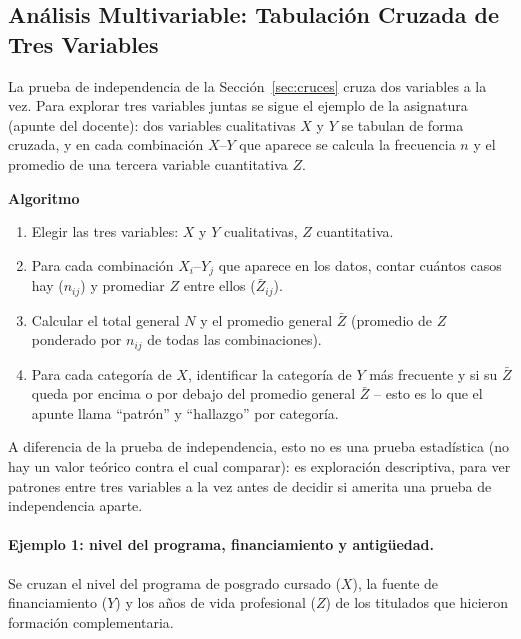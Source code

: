\documentclass[12pt, a4paper]{article}
\begin{document}


\subsection{Análisis Multivariable: Tabulación Cruzada de Tres Variables}\label{sec:resultado-multivariable}

La prueba de independencia de la Sección~\ref{sec:cruces} cruza dos
variables a la vez. Para explorar tres variables juntas se sigue el
ejemplo de la asignatura (apunte del docente): dos variables
cualitativas $X$ y $Y$ se tabulan de forma cruzada, y en cada
combinación $X$--$Y$ que aparece se calcula la frecuencia $n$ y el
promedio de una tercera variable cuantitativa $Z$.

\textbf{Algoritmo}

\begin{enumerate}
  \item Elegir las tres variables: $X$ y $Y$ cualitativas, $Z$ cuantitativa.
  \item Para cada combinación $X_i$--$Y_j$ que aparece en los datos,
  contar cuántos casos hay ($n_{ij}$) y promediar $Z$ entre ellos
  ($\bar{Z}_{ij}$).
  \item Calcular el total general $N$ y el promedio general $\bar{Z}$
  (promedio de $Z$ ponderado por $n_{ij}$ de todas las combinaciones).
  \item Para cada categoría de $X$, identificar la categoría de $Y$ más
  frecuente y si su $\bar{Z}$ queda por encima o por debajo del promedio
  general $\bar{Z}$ -- esto es lo que el apunte llama ``patrón'' y
  ``hallazgo'' por categoría.
\end{enumerate}

A diferencia de la prueba de independencia, esto no es una prueba
estadística (no hay un valor teórico contra el cual comparar): es
exploración descriptiva, para ver patrones entre tres variables a la vez
antes de decidir si amerita una prueba de independencia aparte.

\paragraph{Ejemplo 1: nivel del programa, financiamiento y antigüedad.}
Se cruzan el nivel del programa de posgrado cursado ($X$), la fuente de
financiamiento ($Y$) y los años de vida profesional ($Z$) de los
titulados que hicieron formación complementaria.


\end{document}
